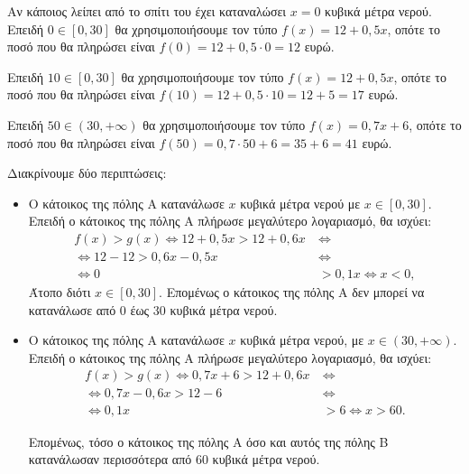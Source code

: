 
\begin{alist}
\item 
\begin{rlist}
\item Αν κάποιος λείπει από το σπίτι του έχει καταναλώσει $x = 0$ κυβικά μέτρα νερού.
Επειδή $0 \in [0, 30]$ θα χρησιμοποιήσουμε τον τύπο $f(x) = 12 + 0,5x$, οπότε το ποσό
που θα πληρώσει είναι
$f(0) = 12 + 0,5 \cdot 0 = 12$ ευρώ.

\item Επειδή $10 \in [0, 30]$ θα χρησιμοποιήσουμε τον τύπο $f(x) = 12 + 0,5x$, οπότε το ποσό
που θα πληρώσει είναι
$f(10) = 12 + 0,5 \cdot 10 = 12 + 5 = 17$ ευρώ.

\item Επειδή $50 \in (30, +\infty)$ θα χρησιμοποιήσουμε τον τύπο $f(x) = 0,7x + 6$, οπότε το
ποσό που θα πληρώσει είναι
$f(50) = 0,7 \cdot 50 + 6 = 35 + 6 = 41$ ευρώ.
\end{rlist}

\item Διακρίνουμε δύο περιπτώσεις:
\begin{itemize}
\item Ο κάτοικος της πόλης Α κατανάλωσε $x$ κυβικά μέτρα νερού με $x \in [0, 30]$. Επειδή ο
κάτοικος της πόλης Α πλήρωσε μεγαλύτερο λογαριασμό, θα ισχύει:
\begin{align*}
f(x) > g(x) \Leftrightarrow 12 + 0,5x > 12 + 0,6x \ &\Leftrightarrow \\
\Leftrightarrow 12 - 12 > 0,6x - 0,5x \ &\Leftrightarrow \\
\Leftrightarrow 0 &> 0,1x \Leftrightarrow x < 0,
\end{align*}
Άτοπο διότι $x \in [0, 30]$.
Επομένως ο κάτοικος της πόλης Α δεν μπορεί να κατανάλωσε από 0 έως 30 κυβικά
μέτρα νερού.

\item Ο κάτοικος της πόλης Α κατανάλωσε $x$ κυβικά μέτρα νερού, με $x \in (30, +\infty)$. Επειδή
ο κάτοικος της πόλης Α πλήρωσε μεγαλύτερο λογαριασμό, θα ισχύει:
\begin{align*}
f(x) > g(x) \Leftrightarrow 0,7x + 6 > 12 + 0,6x \ &\Leftrightarrow \\
\Leftrightarrow 0,7x - 0,6x > 12 - 6 \ &\Leftrightarrow \\
\Leftrightarrow 0,1x &> 6 \Leftrightarrow x > 60.
\end{align*}

Επομένως, τόσο ο κάτοικος της πόλης Α όσο και αυτός της πόλης Β κατανάλωσαν
περισσότερα από 60 κυβικά μέτρα νερού.
\end{itemize}
\end{alist}


